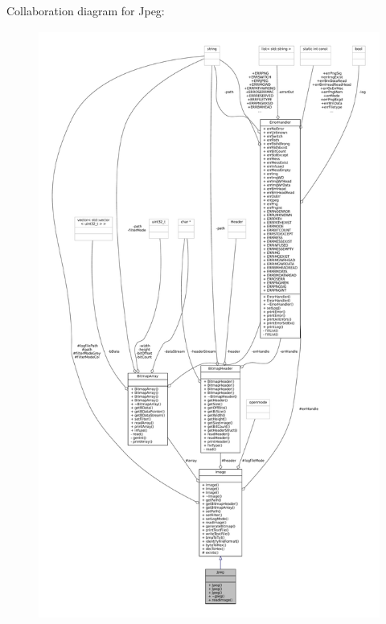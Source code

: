 Collaboration diagram for Jpeg\+:\nopagebreak
\begin{figure}[H]
\begin{center}
\leavevmode
\includegraphics[height=550pt]{classJpeg__coll__graph}
\end{center}
\end{figure}

